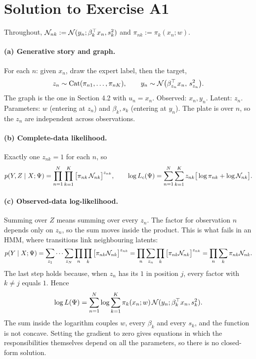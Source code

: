 \section{Solution to Exercise A1}

Throughout, $\mathcal{N}_{nk}:=\mathcal{N}(y_n;\beta_k^{\top} x_n,s_k^2)$ and $\pi_{nk}:=\pi_k(x_n;w)$.

\paragraph{(a) Generative story and graph.} For each $n$: given $x_n$, draw the expert label, then the target,
\begin{equation*}
z_n\sim\text{Cat}(\pi_{n1},\dots,\pi_{nK}),\qquad y_n\sim\mathcal{N}\big(\beta_{z_n}^{\top} x_n,\,s_{z_n}^2\big).
\end{equation*} The graph is the one in Section 4.2 with $u_n=x_n$. Observed: $x_n,y_n$. Latent: $z_n$. Parameters: $w$ (entering at $z_n$) and $\beta_k,s_k$ (entering at $y_n$). The plate is over $n$, so the $z_n$ are independent across observations.

\paragraph{(b) Complete-data likelihood.} Exactly one $z_{nk}=1$ for each $n$, so
\begin{equation}
p(Y,Z\mid X;\Psi)=\prod_{n=1}^N\prod_{k=1}^K\big[\pi_{nk}\,\mathcal{N}_{nk}\big]^{z_{nk}},\qquad\log L_c(\Psi)=\sum_{n=1}^N\sum_{k=1}^Kz_{nk}\big[\log\pi_{nk}+\log\mathcal{N}_{nk}\big].
\end{equation}

\paragraph{(c) Observed-data log-likelihood.} Summing over $Z$ means summing over every $z_n$. The factor for observation $n$ depends only on $z_n$, so the sum moves inside the product. This is what fails in an HMM, where transitions link neighbouring latents:
\begin{equation}
p(Y\mid X;\Psi)=\sum_{z_1}\cdots\sum_{z_N}\prod_n\prod_k\big[\pi_{nk}\mathcal{N}_{nk}\big]^{z_{nk}}=\prod_n\sum_{z_n}\prod_k\big[\pi_{nk}\mathcal{N}_{nk}\big]^{z_{nk}}=\prod_n\sum_k\pi_{nk}\mathcal{N}_{nk}.
\end{equation}
The last step holds because, when $z_n$ has its $1$ in position $j$, every factor with $k\ne j$ equals $1$. Hence
\begin{equation}
\log L(\Psi)=\sum_{n=1}^N\log\sum_{k=1}^K\pi_k(x_n;w)\,\mathcal{N}(y_n;\beta_k^{\top} x_n,s_k^2).
\end{equation}
The sum inside the logarithm couples $w$, every $\beta_k$ and every $s_k$, and the function is not concave. Setting the gradient to zero gives equations in which the responsibilities themselves depend on all the parameters, so there is no closed-form solution.


